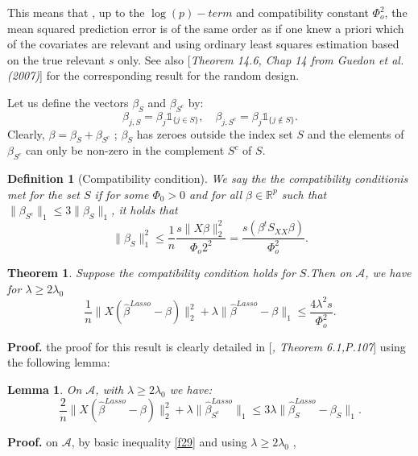 \documentclass[12pt]{report}
\newtheorem{theoreme}{Theorem}[section] %
\newtheorem {lemme}{Lemma} %
\newtheorem {definition}{Definition}[section] %
\begin{document}
This means that , up to the $\log(p)-term$ and compatibility constant $\Phi_{o}^{2}$, the mean squared prediction error is of the same order as if one knew a priori which of the covariates are relevant and using ordinary least squares estimation based on the true relevant $s$ only. 
 See also [\textit{Theorem 14.6, Chap 14 from Guedon et al. (2007)}] for the corresponding result for the random design.

Let us define  the vectors $\beta_{S}$ and $\beta_{S^{c}}$ by:
\begin{equation}
	\beta_{j,S}=\beta_{j}\mathbb{1}_{\{j\in S\}},\quad \beta_{j,S^{c}}=\beta_{j}\mathbb{1}_{\{j\notin S\}}. \label{f33}
\end{equation}
Clearly, $\beta=\beta_{S}+\beta_{S^{c}}$ ; $\beta_{S}$ has zeroes outside the index set $S$ and the elements of $\beta_{S^{c}}$ can only be non-zero in the complement $S^{c}$ of $S$.
\begin{definition}[Compatibility condition]
	We say the the compatibility conditionis met for the set $S$ if for some $\Phi_{0}>0$ and for all $\beta \in \mathbb{R}^{p}$ such that $\parallel\beta_{S^{c}}\parallel_{1}\leq 3 \parallel \beta_{S} \parallel_{1}$, it holds that 
	\begin{equation}
		\parallel \beta_{S} \parallel_{1}^{2}\leq \frac{1}{n}\frac{s\parallel X\beta \parallel_{2}^{2}}{\Phi_{o}2^{2}}=\frac{s(\beta^{t} S_{XX}\beta)}{\Phi_{o}^{2}}.
		\label{f34}
	\end{equation}
	
\end{definition}
 \begin{theoreme}
 	Suppose the compatibility condition holds for $S$.Then on $\mathcal{A}$, we have for $\lambda\geq 2\lambda_{0}$
 	\begin{equation}
 			\frac{1}{n}\parallel X(\hat{\beta}^{Lasso}-\beta )\parallel^{2}_{2}+  \lambda\parallel \hat{\beta}^{Lasso}-\beta \parallel_{1}\leq \frac{4 \lambda^{2}s}{\Phi_{o}^{2}}.
 			\label{f35}
 	\end{equation}
 	
 \end{theoreme}
\textbf{Proof.} the proof for this result is clearly detailed in [\textit{\cite{nref14}, Theorem 6.1,P.107}] using the following lemma:
\begin{lemme}
	On $\mathcal{A}$, with  $\lambda\geq 2\lambda_{0}$ we have:
	\begin{equation}
			\frac{2}{n}\parallel X(\hat{\beta}^{Lasso}-\beta )\parallel^{2}_{2}+ \lambda \parallel \hat{\beta}^{Lasso}_{S^{c}}\parallel_{1}\leq 3\lambda \parallel \hat{\beta}^{Lasso}_{S}-\beta_{S} \parallel_{1}.
			\label{f36}
	\end{equation}
\end{lemme}
\textbf{Proof.} on $\mathcal{A}$, by basic inequality \eqref{f29}  and using  $\lambda\geq 2\lambda_{0}$ , \\
\end{document}
